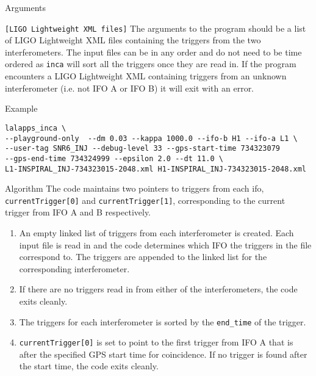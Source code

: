 \begin{entry}
\begin{entry}
\end{entry}

\item[Arguments]\leavevmode
\begin{entry}
\item[\texttt{[LIGO Lightweight XML files]}] The arguments to the program
should be a list of LIGO Lightweight XML files containing the triggers from
the two interferometers. The input files can be in any order and do not need
to be time ordered as \texttt{inca} will sort all the triggers once they are
read in. If the program encounters a LIGO Lightweight XML containing triggers
from an unknown interferometer (i.e. not IFO A or IFO B) it will exit with an
error.
\end{entry}

\item[Example]
\begin{verbatim}
lalapps_inca \
--playground-only  --dm 0.03 --kappa 1000.0 --ifo-b H1 --ifo-a L1 \
--user-tag SNR6_INJ --debug-level 33 --gps-start-time 734323079
--gps-end-time 734324999 --epsilon 2.0 --dt 11.0 \
L1-INSPIRAL_INJ-734323015-2048.xml H1-INSPIRAL_INJ-734323015-2048.xml
\end{verbatim}

\item[Algorithm]
The code maintains two pointers to triggers from each ifo,
\texttt{currentTrigger[0]} and \texttt{currentTrigger[1]}, corresponding to
the current trigger from IFO A and B respectively.

\begin{enumerate}
\item An empty linked list of triggers from each interferometer is created.
Each input file is read in and the code determines which IFO the triggers in
the file correspond to. The triggers are appended to the linked list for the
corresponding interferometer.

\item If there are no triggers read in from either of the interferometers,
the code exits cleanly.

\item The triggers for each interferometer is sorted by the \texttt{end\_time}
of the trigger.

\item \texttt{currentTrigger[0]} is set to point to the first trigger from IFO
A that is after the specified GPS start time for coincidence. If no trigger is
found after the start time, the code exits cleanly.


\end{enumerate}
\end{entry}
